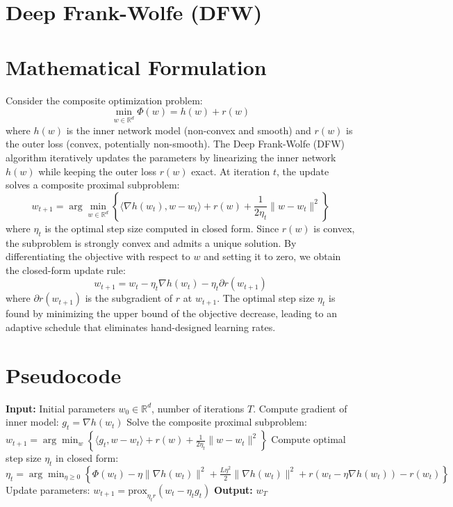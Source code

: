 \documentclass{article}
\begin{document}
\section*{Deep Frank-Wolfe (DFW)}
\section*{Mathematical Formulation}
Consider the composite optimization problem:
\begin{equation}
    \min_{w \in \mathbb{R}^d} \Phi(w) = h(w) + r(w)
\end{equation}
where $h(w)$ is the inner network model (non-convex and smooth) and $r(w)$ is the outer loss (convex, potentially non-smooth). The Deep Frank-Wolfe (DFW) algorithm iteratively updates the parameters by linearizing the inner network $h(w)$ while keeping the outer loss $r(w)$ exact. At iteration $t$, the update solves a composite proximal subproblem:
\begin{equation}
    w_{t+1} = \arg\min_{w \in \mathbb{R}^d} \left\{ \langle \nabla h(w_t), w - w_t \rangle + r(w) + \frac{1}{2\eta_t} \|w - w_t\|^2 \right\}
\end{equation}
where $\eta_t$ is the optimal step size computed in closed form. Since $r(w)$ is convex, the subproblem is strongly convex and admits a unique solution. By differentiating the objective with respect to $w$ and setting it to zero, we obtain the closed-form update rule:
\begin{equation}
    w_{t+1} = w_t - \eta_t \nabla h(w_t) - \eta_t \partial r(w_{t+1})
\end{equation}
where $\partial r(w_{t+1})$ is the subgradient of $r$ at $w_{t+1}$. The optimal step size $\eta_t$ is found by minimizing the upper bound of the objective decrease, leading to an adaptive schedule that eliminates hand-designed learning rates.

\section*{Pseudocode}
\begin{algorithmic}[1]
\State \textbf{Input:} Initial parameters $w_0 \in \mathbb{R}^d$, number of iterations $T$.
    \State Compute gradient of inner model: $g_t = \nabla h(w_t)$
    \State Solve the composite proximal subproblem:
    \Statex \hspace{2em} $w_{t+1} = \arg\min_{w} \left\{ \langle g_t, w - w_t \rangle + r(w) + \frac{1}{2\eta_t} \|w - w_t\|^2 \right\}$
    \State Compute optimal step size $\eta_t$ in closed form:
    \Statex \hspace{2em} $\eta_t = \arg\min_{\eta \geq 0} \left\{ \Phi(w_t) - \eta \|\nabla h(w_t)\|^2 + \frac{L\eta^2}{2} \|\nabla h(w_t)\|^2 + r(w_t - \eta \nabla h(w_t)) - r(w_t) \right\}$
    \State Update parameters: $w_{t+1} = \text{prox}_{\eta_t r}(w_t - \eta_t g_t)$
\EndFor
\State \textbf{Output:} $w_T$
\end{algorithmic}
\end{document}
